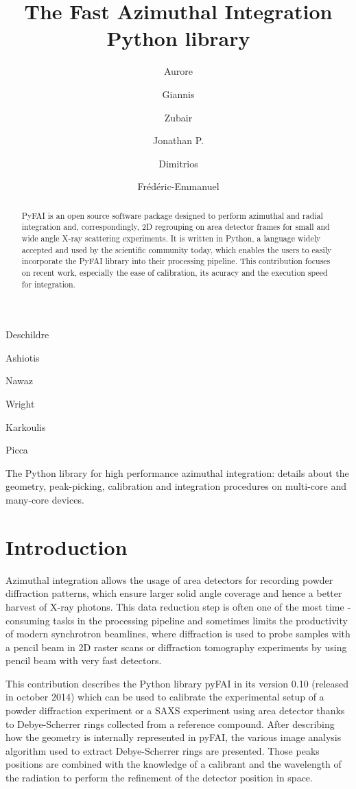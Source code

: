 \documentclass[preprint]{iucr}
\begin{document}
\title{The Fast Azimuthal Integration Python library}

    \author[a]{Aurore}{Deschildre}
    \author[a]{Giannis}{Ashiotis}
    \author[b]{Zubair}{Nawaz}
    \author[a]{Jonathan P.}{Wright}
    \author[a]{Dimitrios}{Karkoulis}
    \author[c]{Fr\'ed\'eric-Emmanuel}{Picca}

\maketitle

\begin{synopsis}
The Python library for high performance azimuthal integration: details about the
geometry, peak-picking, calibration and integration procedures on multi-core and
many-core devices.
\end{synopsis}

\begin{abstract}
PyFAI is an open source software package designed to perform azimuthal and
radial integration and, correspondingly, 2D regrouping on area detector frames for small and wide
angle X-ray scattering experiments. 
It is written in Python, a language widely accepted and used by the scientific 
community today, which enables the users to easily incorporate the PyFAI 
library into their processing pipeline. 
This contribution focuses on recent work, especially the ease of
calibration, its acuracy and the execution speed for integration.
\end{abstract}

\section{Introduction}
Azimuthal integration allows the usage of area detectors for recording powder
diffraction patterns, which  ensure larger solid angle coverage and hence a
better harvest of X­-ray photons.
This data reduction step is often one of the most time ­consuming tasks in the
processing pipeline and sometimes limits the productivity of modern synchrotron
beamlines, where diffraction is used to probe samples with a  pencil beam in 2D
raster scans or diffraction tomography experiments by using pencil beam with
very fast detectors.

This contribution describes the Python library pyFAI in its version 0.10
(released in october 2014) which can be used to calibrate the experimental
setup of a powder diffraction experiment or a SAXS experiment using area
detector thanks to Debye-Scherrer rings collected from a reference compound. 
After describing how the geometry is internally represented in pyFAI, the
various image analysis algorithm used to extract Debye-Scherrer rings are presented.
Those peaks positions are combined with the knowledge of a calibrant and the
wavelength of the radiation to perform the refinement of the detector position
in space.
\end{document}
